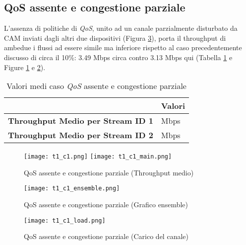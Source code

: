 \subsection[QoS assente e congestione parziale]{QoS assente e congestione parziale}
L'assenza di politiche di \textit{QoS}, unito ad un canale parzialmente disturbato da CAM inviati dagli altri due dispositivi (Figura \ref{fig:t1_c1_load}), porta il throughput di ambedue i flussi ad essere simile ma inferiore rispetto al caso precedentemente discusso di circa il 10\%: 3.49 Mbps circa contro 3.13 Mbps qui (Tabella \ref{table:7} e Figure \ref{fig:t1_c1} e \ref{fig:t1_c1_ensemble}).

\begin{table}[h!]
    \centering
    \begin{tabular}{|>{\centering\arraybackslash}p{20em}|>{\centering\arraybackslash}p{7em}|} 
     \hline
     \textbf{} & \textbf{Valori} \\ 
     \hline
     \textbf{Throughput Medio per Stream ID 1} & 3.13 Mbps \\ 
     \hline
     \textbf{Throughput Medio per Stream ID 2} & 3.13 Mbps \\
     \hline
    \end{tabular}
    \caption{Valori medi caso \textit{QoS} assente e congestione parziale}
    \label{table:7}
\end{table}

\begin{figure}[h!]
    \centering
    \texttt{[image: t1\_c1.png]}
    \texttt{[image: t1\_c1\_main.png]}
    \caption{QoS assente e congestione parziale (Throughput medio)}
    \label{fig:t1_c1}
\end{figure}

\begin{figure}[h!]
    \centering
    \texttt{[image: t1\_c1\_ensemble.png]}
    \caption{QoS assente e congestione parziale (Grafico ensemble)}
    \label{fig:t1_c1_ensemble}
\end{figure}

\begin{figure}[h!]
    \centering
    \texttt{[image: t1\_c1\_load.png]}
    \caption{QoS assente e congestione parziale (Carico del canale)}
    \label{fig:t1_c1_load}
\end{figure}
\clearpage
\newpage
